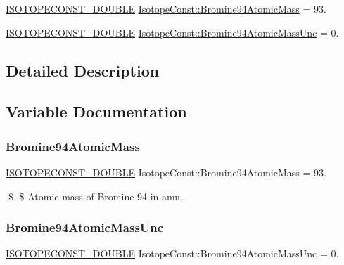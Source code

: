 \begin{DoxyCompactItemize}
\item 
\mbox{\hyperlink{group___isotope_const-_macros_ga8f45a7272ce02c0b4c65c44636ed719a}{I\+S\+O\+T\+O\+P\+E\+C\+O\+N\+S\+T\+\_\+\+D\+O\+U\+B\+LE}} \mbox{\hyperlink{group___isotope_const-_bromine-_br94_ga24cc9801237e2e98d0715eacd458dbf9}{Isotope\+Const\+::\+Bromine94\+Atomic\+Mass}} = 93.
\item 
\mbox{\hyperlink{group___isotope_const-_macros_ga8f45a7272ce02c0b4c65c44636ed719a}{I\+S\+O\+T\+O\+P\+E\+C\+O\+N\+S\+T\+\_\+\+D\+O\+U\+B\+LE}} \mbox{\hyperlink{group___isotope_const-_bromine-_br94_gaca3b84b74c40284de6f1b23ab41dd831}{Isotope\+Const\+::\+Bromine94\+Atomic\+Mass\+Unc}} = 0.
\end{DoxyCompactItemize}


\subsection{Detailed Description}


\subsection{Variable Documentation}
\mbox{\label{group___isotope_const-_bromine-_br94_ga24cc9801237e2e98d0715eacd458dbf9}} 
\subsubsection{\texorpdfstring{Bromine94\+Atomic\+Mass}{Bromine94AtomicMass}}
{\footnotesize\ttfamily \mbox{\hyperlink{group___isotope_const-_macros_ga8f45a7272ce02c0b4c65c44636ed719a}{I\+S\+O\+T\+O\+P\+E\+C\+O\+N\+S\+T\+\_\+\+D\+O\+U\+B\+LE}} Isotope\+Const\+::\+Bromine94\+Atomic\+Mass = 93.}

\$ \$ Atomic mass of Bromine-\/94 in amu. \mbox{\label{group___isotope_const-_bromine-_br94_gaca3b84b74c40284de6f1b23ab41dd831}} 
\subsubsection{\texorpdfstring{Bromine94\+Atomic\+Mass\+Unc}{Bromine94AtomicMassUnc}}
{\footnotesize\ttfamily \mbox{\hyperlink{group___isotope_const-_macros_ga8f45a7272ce02c0b4c65c44636ed719a}{I\+S\+O\+T\+O\+P\+E\+C\+O\+N\+S\+T\+\_\+\+D\+O\+U\+B\+LE}} Isotope\+Const\+::\+Bromine94\+Atomic\+Mass\+Unc = 0.}

